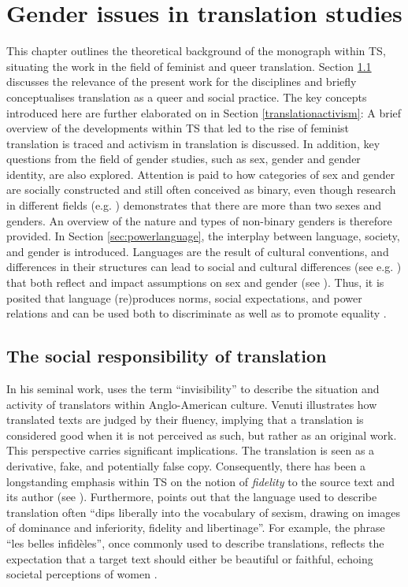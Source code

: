 \chapter{Gender issues in translation studies} \label{chapter2-1}

This chapter outlines the theoretical background of the monograph within TS, situating the work in the field of feminist and queer translation. Section \ref{TSrelevance} discusses the relevance of the present work for the disciplines and briefly conceptualises translation as a queer and social practice. The key concepts introduced here are further elaborated on in Section \ref{translationactivism}: A brief overview of the developments within TS that led to the rise of feminist translation is traced and activism in translation is discussed. In addition, key questions from the field of gender studies, such as sex, gender and gender identity, are also explored. Attention is paid to how categories of sex and gender are socially constructed and still often conceived as binary, even though research in different fields (e.g. \cite{fausto2012sex,richards2016non}) demonstrates that there are more than two sexes and genders. An overview of the nature and types of non-binary genders is therefore provided. In Section \ref{sec:powerlanguage}, the interplay between language, society, and gender is introduced. Languages are the result of cultural conventions, and differences in their structures can lead to social and cultural differences (see e.g. \cite{prewitt2012gendering,santacreu2013female}) that both reflect and impact assumptions on sex and gender (see \cite{boroditsky2003sex,stahlberg2007representation}). Thus, it is posited that language (re)produces norms, social expectations, and power relations and can be used both to discriminate as well as to promote equality \citep{sprachhandeln2015tun}. 

\section{The social responsibility of translation} \label{TSrelevance}
In his seminal work, \textcite{venuti1995translator} uses the term “invisibility” to describe the situation and activity of translators within Anglo-American culture. Venuti illustrates how translated texts are judged by their fluency, implying that a translation is considered good when it is not perceived as such, but rather as an original work. This perspective carries significant implications. The translation is seen as a derivative, fake, and potentially false copy. Consequently, there has been a longstanding emphasis within TS on the notion of \textit{fidelity} to the source text and its author (see \cite{pym2017exploring}). Furthermore, \textcite[1]{simon1996gender} points out that the language used to describe translation often ``dips liberally into the vocabulary of sexism, drawing on images of dominance and inferiority, fidelity and libertinage''. For example, the phrase ``les belles infidèles'', once commonly used to describe translations, reflects the expectation that a target text should either be beautiful or faithful, echoing societal perceptions of women \citep[10]{simon1996gender}.


